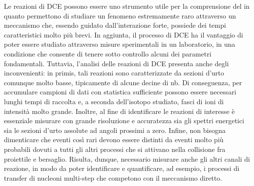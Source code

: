 Le reazioni di DCE possono essere uno strumento utile per la comprensione del \doppiobeta{} in quanto permettono di studiare un fenomeno estremamente raro attraverso un meccanismo che, essendo guidato dall'interazione forte, possiede dei tempi caratteristici molto più brevi. 
In aggiunta, il processo di DCE ha il vantaggio di poter essere studiato attraverso misure sperimentali in un laboratorio, in una condizione che consente di tenere sotto controllo alcuni dei parametri fondamentali.
Tuttavia, l'analisi delle reazioni di DCE presenta anche degli inconvenienti: in primis, tali reazioni sono caratterizzate da sezioni d'urto comunque molto basse, tipicamente di alcune decine di nb.
Di conseguenza, per accumulare campioni di dati con statistica sufficiente possono essere necessari lunghi tempi di raccolta e, a seconda dell'isotopo studiato, fasci di ioni di intensità molto grande.
Inoltre, al fine di identificare le reazioni di interesse è essenziale misurare con grande risoluzione e accuratezza sia gli spettri energetici sia le sezioni d'urto assolute ad angoli prossimi a zero. 
Infine, non bisogna dimenticare che eventi così rari devono essere distinti da eventi molto più probabili dovuti a tutti gli altri processi che si attivano nella collisione fra proiettile e bersaglio. 
Risulta, dunque, necessario misurare anche gli altri canali di reazione, in modo da poter identificare e quantificare, ad esempio, i processi di transfer di nucleoni multi-step che competono con il meccanismo diretto.




\section{} \label{sez:progetto_numen}

